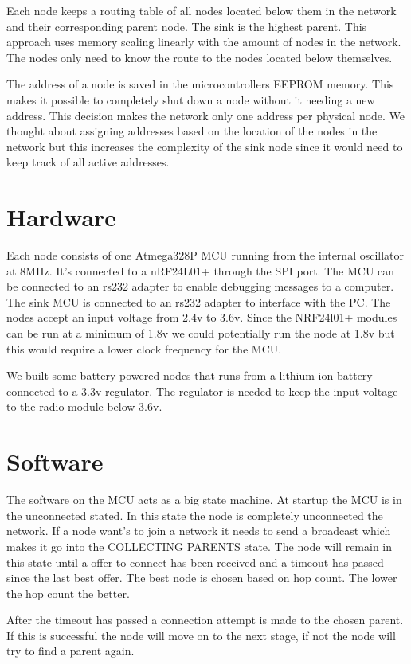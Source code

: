 \documentclass[a4paper,11pt]{article}
\begin{document}
Each node keeps a routing table of all nodes located below them in the
network and their corresponding parent node. The sink is the highest
parent. This approach uses memory scaling linearly with the amount of
nodes in the network. The nodes only need to know the route to the
nodes located below themselves.

The address of a node is saved in the microcontrollers EEPROM memory.
This makes it possible to completely shut down a node without it
needing a new address. This decision makes the network only one
address per physical node. We thought about assigning addresses based
on the location of the nodes in the network but this increases the
complexity of the sink node since it would need to keep track of all
active addresses.

\section{Hardware}
Each node consists of one Atmega328P MCU running from the internal
oscillator at 8MHz. It's connected to a nRF24L01+ through the SPI
port. The MCU can be connected to an rs232 adapter to enable debugging
messages to a computer. The sink MCU is connected to an rs232 adapter
to interface with the PC. The nodes accept an input voltage from 2.4v
to 3.6v. Since the NRF24l01+ modules can be run at a minimum of 1.8v
we could potentially run the node at 1.8v but this would require a
lower clock frequency for the MCU\cite{Atmega}.

We built some battery powered nodes that runs from a lithium-ion
battery connected to a 3.3v regulator. The regulator is needed to keep
the input voltage to the radio module below 3.6v.

\section{Software}
The software on the MCU acts as a big state machine. At startup the
MCU is in the unconnected stated. In this state the node is completely
unconnected the network. If a node want's to join a network it needs
to send a broadcast which makes it go into the COLLECTING PARENTS
state. The node will remain in this state until a offer to connect has
been received and a timeout has passed since the last best offer. The
best node is chosen based on hop count. The lower the hop count the
better.

After the timeout has passed a connection attempt is made to the
chosen parent. If this is successful the node will move on to the
next stage, if not the node will try to find a parent again.
\end{document}
